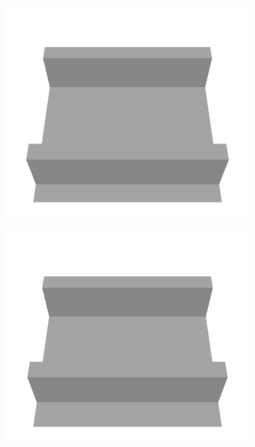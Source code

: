 \begin{figure}[H]
\begin{subfigure}[b]{0.24\textwidth}
    \end{subfigure}
    \begin{subfigure}[b]{0.24\textwidth}
    \includegraphics[width=\linewidth]{../img/5/custom_patches/tunnel/all/08-3d.png}
    \end{subfigure}
    \begin{subfigure}[b]{0.24\textwidth}
    \includegraphics[width=\linewidth]{../img/5/custom_patches/tunnel/all/11-3d.png}
    \end{subfigure}

\end{figure}
